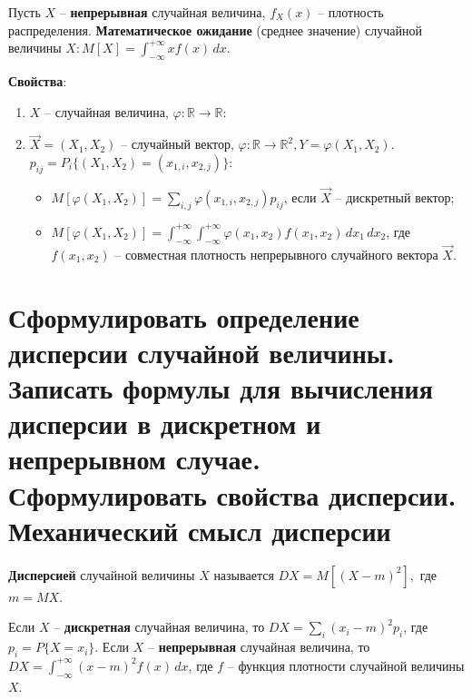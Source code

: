 Пусть $X$ -- \textbf{непрерывная} случайная величина, $f_X(x)$ -- плотность распределения. \textbf{Математическое ожидание} (среднее значение) случайной величины $X: M[X] = \int_{-\infty}^{+\infty} xf(x)\, dx$.

\clearpage

\textbf{Свойства}:
\begin{enumerate}
	\item $X$ -- случайная величина, $\varphi: \mathbb{R} \rightarrow \mathbb{R}$:
	\begin{itemize}
		\item $M[\varphi(X)] = \sum_{i} \varphi(x_i)p_i$, если $X$ -- дискретная случайная величина;
		\item}$M[\varphi(X)] = \int_{-\infty}^{+\infty} \varphi(x)f(x) \, dx$, если $X$ -- непрерывная случайная величина, $f(x)$ -- плотность;
	\end{itemize}
	\item $\vec{X} = (X_1, X_2)$ -- случайный вектор, $\varphi: \mathbb{R} \rightarrow \mathbb{R}^2, Y = \varphi(X_1, X_2)$. $p_{ij} = P_i\{(X_1, X_2) = (x_{1, i}, x_{2, j})\}$:
	\begin{itemize}
		\item $M[\varphi(X_1, X_2)] = \sum_{i, j} \varphi (x_{1, i}, x_{2, j})p_{ij}$, если $\vec{X}$ -- дискретный вектор;
		\item $M[\varphi(X_1, X_2)] = \int_{-\infty}^{+\infty} \int_{-\infty}^{+\infty} \varphi(x_1, x_2)f(x_1, x_2) \, dx_1 \, dx_2$, где $f(x_1, x_2)$ -- совместная плотность непрерывного случайного вектора $\vec{X}$.
	\end{itemize}
\end{enumerate}

\section{Сформулировать определение дисперсии случайной величины. Записать формулы для вычисления дисперсии в дискретном и непрерывном случае. Сформулировать свойства дисперсии. Механический смысл дисперсии}

\textbf{Дисперсией} случайной величины $X$ называется $DX = M[(X-m)^2],$ где $m=MX$.

Если $X$ -- \textbf{дискретная} случайная величина, то $DX = \sum_{i} (x_i - m)^2 p_i$, где $p_i = P\{X=x_i\}$. Если  $X$ -- \textbf{непрерывная} случайная величина, то $DX = \int_{-\infty}^{+\infty} (x-m)^2f(x) \, dx$, где $f$ -- функция плотности случайной величины $X$.

